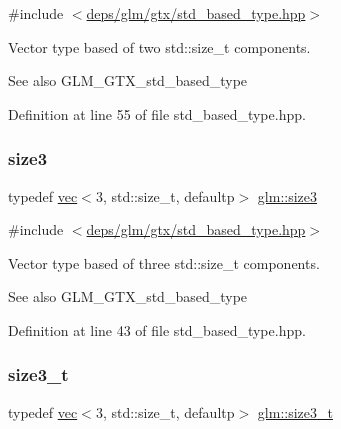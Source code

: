 {\ttfamily \#include $<$\hyperlink{std__based__type_8hpp}{deps/glm/gtx/std\+\_\+based\+\_\+type.\+hpp}$>$}

Vector type based of two std\+::size\+\_\+t components. \begin{DoxySeeAlso}{See also}
G\+L\+M\+\_\+\+G\+T\+X\+\_\+std\+\_\+based\+\_\+type 
\end{DoxySeeAlso}


Definition at line 55 of file std\+\_\+based\+\_\+type.\+hpp.

\mbox{\label{group__gtx__std__based__type_ga2da33d9da32b31af75f036d948b54de5}} 
\subsubsection{\texorpdfstring{size3}{size3}}
{\footnotesize\ttfamily typedef \hyperlink{structglm_1_1vec}{vec}$<$3, std\+::size\+\_\+t, defaultp$>$ \hyperlink{group__gtx__std__based__type_ga2da33d9da32b31af75f036d948b54de5}{glm\+::size3}}



{\ttfamily \#include $<$\hyperlink{std__based__type_8hpp}{deps/glm/gtx/std\+\_\+based\+\_\+type.\+hpp}$>$}

Vector type based of three std\+::size\+\_\+t components. \begin{DoxySeeAlso}{See also}
G\+L\+M\+\_\+\+G\+T\+X\+\_\+std\+\_\+based\+\_\+type 
\end{DoxySeeAlso}


Definition at line 43 of file std\+\_\+based\+\_\+type.\+hpp.

\mbox{\label{group__gtx__std__based__type_gaf0ec088c61853e4ed8155ef66b3760a2}} 
\subsubsection{\texorpdfstring{size3\+\_\+t}{size3\_t}}
{\footnotesize\ttfamily typedef \hyperlink{structglm_1_1vec}{vec}$<$3, std\+::size\+\_\+t, defaultp$>$ \hyperlink{group__gtx__std__based__type_gaf0ec088c61853e4ed8155ef66b3760a2}{glm\+::size3\+\_\+t}}



